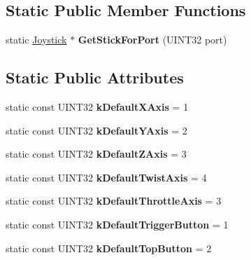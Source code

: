 \subsection*{Static Public Member Functions}
\begin{DoxyCompactItemize}
\item 
\hypertarget{classJoystick_a4e134a21fe02f9cb6124c6e0d1391db0}{
static \hyperlink{classJoystick}{Joystick} $\ast$ {\bfseries GetStickForPort} (UINT32 port)}
\label{classJoystick_a4e134a21fe02f9cb6124c6e0d1391db0}

\end{DoxyCompactItemize}
\subsection*{Static Public Attributes}
\begin{DoxyCompactItemize}
\item 
\hypertarget{classJoystick_aca8b52e0227268a44e62000a995e6545}{
static const UINT32 {\bfseries kDefaultXAxis} = 1}
\label{classJoystick_aca8b52e0227268a44e62000a995e6545}

\item 
\hypertarget{classJoystick_a1f0904da828bfe3d99f229ad39634984}{
static const UINT32 {\bfseries kDefaultYAxis} = 2}
\label{classJoystick_a1f0904da828bfe3d99f229ad39634984}

\item 
\hypertarget{classJoystick_a1318a7bfeb9134e7c6f024afcbe677c1}{
static const UINT32 {\bfseries kDefaultZAxis} = 3}
\label{classJoystick_a1318a7bfeb9134e7c6f024afcbe677c1}

\item 
\hypertarget{classJoystick_af8c4e12b864e53ee4a5b02c2d7f3999d}{
static const UINT32 {\bfseries kDefaultTwistAxis} = 4}
\label{classJoystick_af8c4e12b864e53ee4a5b02c2d7f3999d}

\item 
\hypertarget{classJoystick_a8e8b23407e6daebec33f2302d1674d76}{
static const UINT32 {\bfseries kDefaultThrottleAxis} = 3}
\label{classJoystick_a8e8b23407e6daebec33f2302d1674d76}

\item 
\hypertarget{classJoystick_a4693bae107e007140460dd546a2ee135}{
static const UINT32 {\bfseries kDefaultTriggerButton} = 1}
\label{classJoystick_a4693bae107e007140460dd546a2ee135}

\item 
\hypertarget{classJoystick_a4357a68c718d794a8b9b5a48bfa8cc07}{
static const UINT32 {\bfseries kDefaultTopButton} = 2}
\label{classJoystick_a4357a68c718d794a8b9b5a48bfa8cc07}

\end{DoxyCompactItemize}


